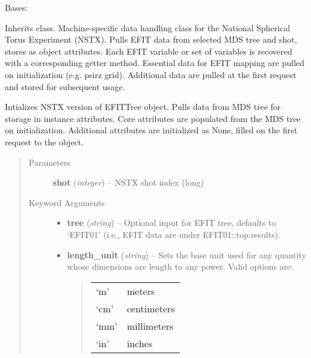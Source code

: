 \documentclass[letterpaper,10pt,english]{sphinxmanual}
\begin{document}
\begin{fulllineitems}
\label{eqtools:eqtools.NSTXEFIT.NSTXEFITTree}
Bases: {\hyperref[eqtools:eqtools.EFIT.EFITTree]{}}

Inherits  class. Machine-specific data
handling class for the National Spherical Torus Experiment (NSTX). Pulls EFIT
data from selected MDS tree and shot, stores as object attributes. Each EFIT
variable or set of variables is recovered with a corresponding getter method.
Essential data for EFIT mapping are pulled on initialization (e.g. psirz grid).
Additional data are pulled at the first request and stored for subsequent usage.

Intializes NSTX version of EFITTree object.  Pulls data from MDS tree for storage
in instance attributes.  Core attributes are populated from the MDS tree on initialization.
Additional attributes are initialized as None, filled on the first request to the object.
\begin{quote}\begin{description}
\item[{Parameters}] \leavevmode
\textbf{shot} (\emph{integer}) --
NSTX shot index (long)

\item[{Keyword Arguments}] \leavevmode\begin{itemize}
\item {} 
\textbf{tree} (\emph{string}) --
Optional input for EFIT tree, defaults to `EFIT01'
(i.e., EFIT data are under EFIT01::top.results).

\item {} 
\textbf{length\_unit} (\emph{string}) --
Sets the base unit used for any quantity whose
dimensions are length to any power. Valid options are:
\begin{quote}

\begin{tabulary}{\linewidth}{|L|L|}
\hline

`m'
 & 
meters
\\

`cm'
 & 
centimeters
\\

`mm'
 & 
millimeters
\\

`in'
 & 
inches
\\


\end{tabulary}
\end{quote}
\end{itemize}
\end{description}
\end{quote}
\end{fulllineitems}
\end{document}
